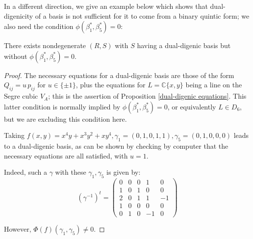 \documentclass{report}
\begin{document}
In a different direction, we give an example below which shows that dual-digenicity of a basis is not sufficient for it to come from a binary quintic form; we also need the condition $\phi(\beta_1^*,\beta_5^*) = 0$:

\begin{lemma}
There exists nondegenerate $(R,S)$ with $S$ having a dual-digenic basis but without $\phi(\beta_1^*,\beta_5^*) = 0$.
\end{lemma}
\begin{proof}
The necessary equations for a dual-digenic basis are those of the form $Q_{ij} = u \, p_{ij}$ for $u \in \{ \pm 1 \}$, plus the equations for $L = \mathbb{C}\{x,y\}$ being a line on the Segre cubic $V_A$; this is the assertion of Proposition \ref{dual-digenic equations}.  This latter condition is normally implied by $\phi(\beta_1^*,\beta_5^*) = 0$, or equivalently $L \in D_6$, but we are excluding this condition here.

Taking $f(x,y) = x^4 y + x^3 y^2 + xy^4, \gamma_1 = (0,1,0,1,1), \gamma_5 = (0,1,0,0,0)$ leads to a dual-digenic basis, as can be shown by checking by computer that the necessary equations are all satisfied, with $u = 1$.

Indeed, such a $\gamma$ with these $\gamma_1, \gamma_5$ is given by:
\begin{equation}
(\gamma^{-1})^t =
\begin{pmatrix}
0 & 0 & 0 & 1 & 0 \\
1 & 0 & 1 & 0 & 0 \\
2 & 0 & 1 & 1 & -1 \\
1 & 0 & 0 & 0 & 0 \\
0 & 1 & 0 & -1 & 0
\end{pmatrix}
\end{equation}

However, $\Phi(f)(\gamma_1,\gamma_5) \neq 0$.
\end{proof}
\end{document}
